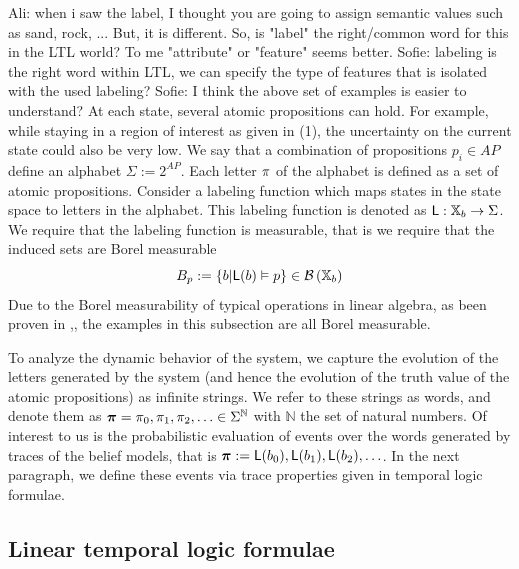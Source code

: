 \documentclass{ifacconf}
\newcommand{\red}[1]{{\color{red} #1}}
\renewcommand{\axx}[1]{{\color{orange} Ali: #1}}
\newcommand{\new}[1]{{\color{blue}#1}}
\begin{document}
     	\axx{when i saw the label, I thought you are going to assign semantic values such as sand, rock, ... But, it is different. So, is "label" the right/common word for this in the LTL world? To me "attribute" or "feature" seems better. }\red{Sofie: labeling is the right word within LTL, we can specify  the type of features that is isolated with the used labeling?} \red{Sofie: I think the above set of examples is easier to understand?}
      \new{At each state, several  atomic propositions can hold. For example, while staying in a region of interest as given in (1), the uncertainty on the current state could also be very low.  }
   \new{We say that a combination of propositions $p_i\in AP$ define an alphabet $\Sigma := 2^{AP}$. Each letter $\pi$ of the alphabet is defined as a set of atomic propositions.  Consider  a labeling function which maps states in the state space to letters in the alphabet. This labeling function is denoted as $\mathsf{L}:{{\mathbb{X}}_b}\rightarrow \Sigma$.  }
We require that the labeling function is measurable, that is we require that the induced sets  are Borel measurable
\[B_p:=\{b|\mathsf{L}(b)\vDash p \}\in \mathcal{B}\left({{\mathbb{X}}_b}\right)\]    
 Due to the Borel measurability of typical operations in linear algebra,  as been proven in \citep{azoff1974borel},\citep[page 116]{lang1993real}, the examples in this subsection are all Borel measurable.
 
 \new{ To analyze the dynamic behavior of the system, we capture the evolution of the letters generated by the system (and hence the evolution of the truth value of the atomic propositions) as 
infinite strings. We refer to these strings as words, and denote them as ${\boldsymbol{\pi}}=\pi_0,\pi_1,\pi_2,\ldots\in\Sigma^{\mathbb{N}}$ with $\mathbb N$ the set of natural numbers.
Of interest to us is the probabilistic evaluation of events over the words generated by traces of the belief models, that is 
${\boldsymbol{\pi}}:=\mathsf{L}(b_0),\mathsf{L}(b_1),\mathsf{L}(b_2), \ldots$. %
In the next paragraph, we define these events via trace properties given in temporal logic formulae.}
  
  \subsection{Linear temporal logic formulae}
    
\end{document}
